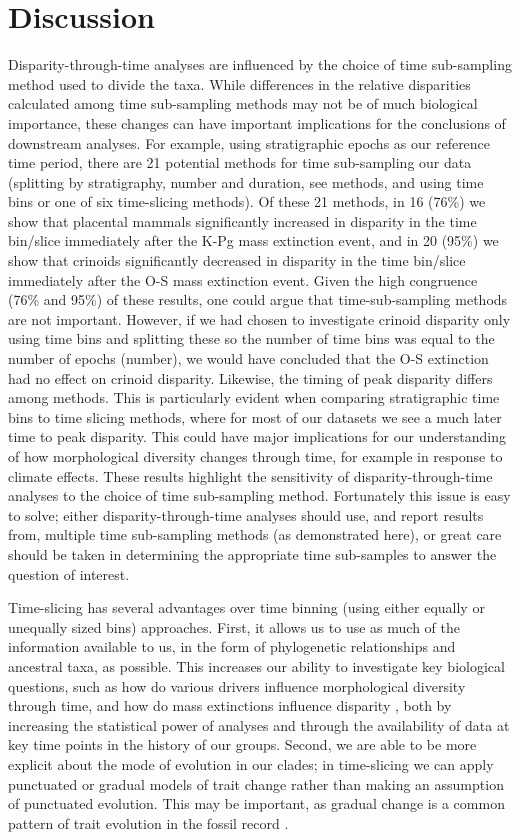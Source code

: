 \documentclass[12pt,a4paper]{article}
\begin{document}
\section{Discussion}
Disparity-through-time analyses are influenced by the choice of time sub-sampling method used to divide the taxa. 
While differences in the relative disparities calculated among time sub-sampling methods may not be of much biological importance, these changes can have important implications for the conclusions of downstream analyses. 
For example, using stratigraphic epochs as our reference time period, there are 21 potential methods for time sub-sampling our data (splitting by stratigraphy, number and duration, see methods, and using time bins or one of six time-slicing methods). 
Of these 21 methods, in 16 (76\%) we show that placental mammals \citep{beckancient2014} significantly increased in disparity in the time bin/slice immediately after the K-Pg mass extinction event, and in 20 (95\%) we show that crinoids \citep{wright2017bayesian} significantly decreased in disparity in the time bin/slice immediately after the O-S mass extinction event.
Given the high congruence (76\% and 95\%) of these results, one could argue that time-sub-sampling methods are not important. 
However, if we had chosen to investigate crinoid disparity only using time bins and splitting these so the number of time bins was equal to the number of epochs (number), we would have concluded that the O-S extinction had no effect on crinoid disparity. 
Likewise, the timing of peak disparity differs among methods. 
This is particularly evident when comparing stratigraphic time bins to time slicing methods, where for most of our datasets we see a much later time to peak disparity. 
This could have major implications for our understanding of how morphological diversity changes through time, for example in response to climate effects.
These results highlight the sensitivity of disparity-through-time analyses to the choice of time sub-sampling method. 
Fortunately this issue is easy to solve; either disparity-through-time analyses should use, and report results from, multiple time sub-sampling methods (as demonstrated here), or great care should be taken in determining the appropriate time sub-samples to answer the question of interest. 

Time-slicing has several advantages over time binning (using either equally or unequally sized bins) approaches.
First, it allows us to use as much of the information available to us, in the form of phylogenetic relationships and ancestral taxa, as possible. 
This increases our ability to investigate key biological questions, such as how do various drivers influence morphological diversity through time, and how do mass extinctions influence disparity \citep{Brusatte12092008,Foote29111996,friedmanexplosive2010}, both by increasing the statistical power of analyses and through the availability of data at key time points in the history of our groups.
Second, we are able to be more explicit about the mode of evolution in our clades; in time-slicing we can apply punctuated or gradual models of trait change rather than making an assumption of punctuated evolution.
This may be important, as gradual change is a common pattern of trait evolution in the fossil record \citep{Hunt20112007}.
\end{document}
